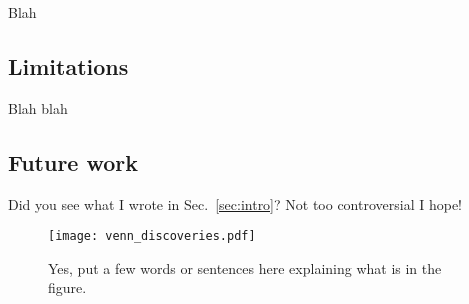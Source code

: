 \documentclass[12pt,a4paper]{article}
\begin{document}
Blah

\subsection{Limitations}\label{sec:limitations}

Blah blah

\subsection{Future work}\label{sec:future}

Did you see what I wrote in Sec.~\ref{sec:intro}? Not too controversial I hope!

\begin{figure}[htbp!]
\begin{center}
\texttt{[image: venn\_discoveries.pdf]}
\end{center}
\caption{Yes, put a few words or sentences here explaining what is in the figure.}
\label{fig:venn}
\end{figure}



\end{document}
